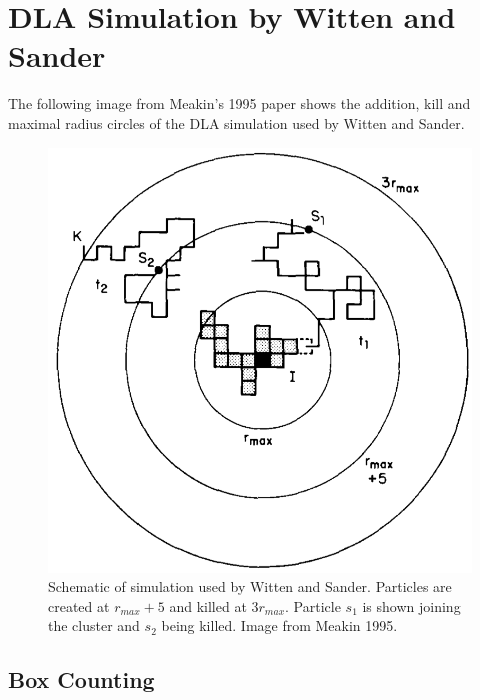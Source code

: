\documentclass[%
 aapm,
 mph,%
 amsmath,amssymb,
 reprint,%
]{revtex4-2}
\begin{document}
\section{\label{ap:witten_dla}DLA Simulation by Witten and Sander}
The following image from Meakin's 1995 paper shows the addition, kill and maximal radius circles of the DLA simulation used by Witten and Sander.
\begin{figure}[h]
\centering
\includegraphics[width=0.8\linewidth]{figures/WittenDLA.png}
\caption{\label{fig:witten_dla_system}Schematic of simulation used by Witten and Sander. Particles are created at $r_{max}+5$ and killed at $3 r_{max}$. Particle $s_1$ is shown joining the cluster and $s_2$ being killed. Image from Meakin 1995\cite{MeakinDLA2}.}
\end{figure}

\subsection{\label{ap:box_counting}Box Counting}
\end{document}
